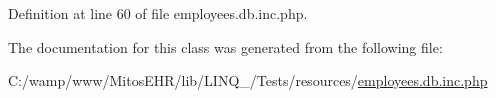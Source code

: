 \-Definition at line 60 of file employees.\-db.\-inc.\-php.



\-The documentation for this class was generated from the following file\-:\begin{DoxyCompactItemize}
\item 
\-C\-:/wamp/www/\-Mitos\-E\-H\-R/lib/\-L\-I\-N\-Q\-\_/\-Tests/resources/\hyperlink{employees_8db_8inc_8php}{employees.\-db.\-inc.\-php}\end{DoxyCompactItemize}
